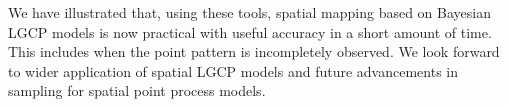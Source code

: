 \documentclass[]{interact}
\begin{document}
We have illustrated that, using these tools, spatial mapping based on Bayesian
LGCP models is now practical with useful accuracy in a short amount of time. This
includes when the point pattern is incompletely observed. We look forward to
wider application of spatial LGCP models and future advancements in sampling
for spatial point process models.









\end{document}

